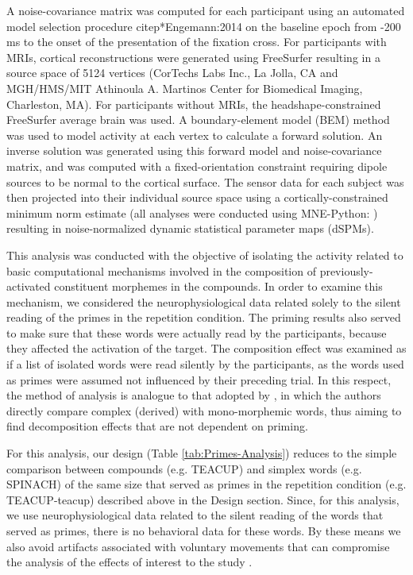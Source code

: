 \documentclass{frontiersSCNS}
\begin{document}
A noise-covariance matrix was computed for each participant using an automated model selection procedure citep*{Engemann:2014} on the baseline epoch from -200 ms to the onset of the presentation of the fixation cross.  For participants with MRIs, cortical reconstructions were generated using FreeSurfer resulting in a source space of 5124 vertices (CorTechs Labs Inc., La Jolla, CA and MGH/HMS/MIT Athinoula A. Martinos Center for Biomedical Imaging, Charleston, MA). For participants without MRIs, the headshape-constrained FreeSurfer average brain was used. A boundary-element model (BEM) method was used to model activity at each vertex to calculate a forward solution. An inverse solution was generated using this forward model and noise-covariance matrix, and was computed with a fixed-orientation constraint requiring dipole sources to be normal to the cortical surface.
The sensor data for each subject was then projected into their individual source space using a cortically-constrained minimum norm estimate (all analyses were conducted using MNE-Python: \citet*{Gramfort:2013, Gramfort:2013a}) resulting in noise-normalized dynamic statistical parameter maps (dSPMs).

This analysis was conducted with the objective of isolating the activity related to basic computational mechanisms involved in the composition of previously-activated constituent morphemes in the compounds. In order to examine this mechanism, we considered the neurophysiological data related solely to the silent reading of the primes in the repetition condition. The priming results also served to make sure that these words were actually read by the participants, because they affected the activation of the target.  The composition effect was examined as if a list of isolated words were read silently by the participants, as the words used as primes were assumed not influenced by their preceding trial. In this respect, the method of analysis is analogue to that adopted by \citet{Zweig:2009}, in which the authors directly compare complex (derived) with mono-morphemic words, thus aiming to find decomposition effects that are not dependent on priming.  

For this analysis, our design (Table \ref{tab:Primes-Analysis}) reduces to the simple comparison between compounds (e.g. TEACUP) and simplex words (e.g. SPINACH) of the same size that served as primes in the repetition condition (e.g. TEACUP-teacup) described above in the Design section. Since, for this analysis, we use neurophysiological data related to the silent reading of the words that served as primes, there is no behavioral data for these words.  By these means we also avoid artifacts associated with voluntary movements that can compromise the analysis of the effects of interest to the study \citep*{Hansen:2010}.
 
\end{document}
